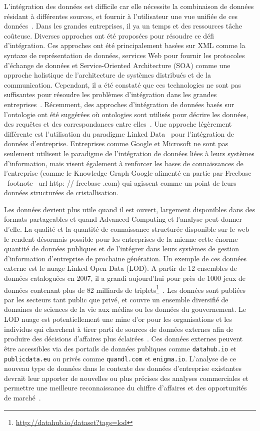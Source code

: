 \documentclass[a4paper,11pt,twoside]{ThesisStyle}
\begin{document}
L'intégration des données est difficile car elle nécessite la combinaison de données résidant à différentes sources, et fournir à l'utilisateur une vue unifiée de ces données~\cite{Lenzerini:SIGMOD:02}. Dans les grandes entreprises, il ya un temps et des ressources tâche coûteuse. Diverses approches ont été proposées pour résoudre ce défi d'intégration. Ces approches ont été principalement basées sur XML comme la syntaxe de représentation de données, services Web pour fournir les protocoles d'échange de données et Service-Oriented Architecture (SOA) comme une approche holistique de l'architecture de systèmes distribués et de la communication. Cependant, il a été constaté que ces technologies ne sont pas suffisantes pour résoudre les problèmes d'intégration dans les grandes entreprises~\cite{Frischmuth:ISWC:13,Frischmuth:SemWebJorunal:12}. Récemment, des approches d'intégration de données basés sur l'ontologie ont été suggérées où ontologies sont utilisés pour décrire les données, des requêtes et des correspondances entre elles~\cite{Wache:IJCAI:01}. Une approche légèrement différente est l'utilisation du paradigme Linked Data~\cite{Bizer:IJSWIS:09} pour l'intégration de données d'entreprise. Entreprises comme Google et Microsoft ne sont pas seulement utilisent le paradigme de l'intégration de données liées à leurs systèmes d'information, mais visent également à renforcer les bases de connaissances de l'entreprise (comme le Knowledge Graph Google alimenté en partie par Freebase \ footnote {\ url {http: // freebase .com}}) qui agissent comme un point de leurs données structurées de cristallisation.

Les données devient plus utile quand il est ouvert, largement disponibles dans des formats partageables et quand Advanced Computing et l'analyse peut donner d'elle. La qualité et la quantité de connaissance structurée disponible sur le web le rendent désormais possible pour les entreprises de la mienne cette énorme quantité de données publiques et de l'intégrer dans leurs systèmes de gestion d'information d'entreprise de prochaine génération. Un exemple de ces données externe est le nuage Linked Open Data (LOD). A partir de 12 ensembles de données cataloguées en 2007, il a grandi aujourd'hui pour près de 1000 jeux de données contenant plus de 82 milliards de triplets\footnote{\url{http://datahub.io/dataset?tags=lod}}~\cite{Bizer:IJSWIS:09}. Les données sont publiées par les secteurs tant public que privé, et couvre un ensemble diversifié de domaines de sciences de la vie aux médias ou les données du gouvernement. Le LOD nuage est potentiellement une mine d'or pour les organisations et les individus qui cherchent à tirer parti de sources de données externes afin de produire des décisions d'affaires plus éclairées~\cite{Boyd:Article:11}. Ces données externes peuvent être accessibles via des portails de données publiques comme \texttt {datahub.io} et \texttt {publicdata.eu} ou privés comme \texttt{quandl.com} et \texttt{enigma.io}. L'analyse de ce nouveau type de données dans le contexte des données d'entreprise existantes devrait leur apporter de nouvelles ou plus précises des analyses commerciales et permettre une meilleure reconnaissance du chiffre d'affaires et des opportunités de marché~\cite{LaValle:MIT:11}.
\end{document}

